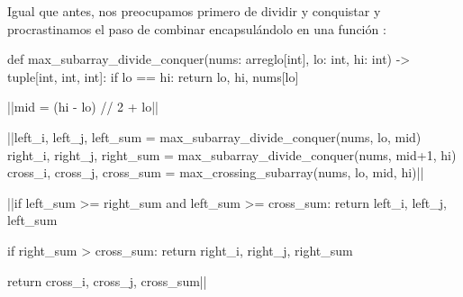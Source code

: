 Igual que antes, nos preocupamos primero de dividir y conquistar y procrastinamos el paso de combinar encapsulándolo en una función :
\begin{codeblock}
\begin{pseudocode}
def max_subarray_divide_conquer(nums: arreglo[int], lo: int, hi: int) -> tuple[int, int, int]:
    if lo == hi: return lo, hi, nums[lo]

    ||mid = (hi - lo) // 2 + lo||

    ||left_i, left_j, left_sum = max_subarray_divide_conquer(nums, lo, mid)
    right_i, right_j, right_sum = max_subarray_divide_conquer(nums, mid+1, hi)
    cross_i, cross_j, cross_sum = max_crossing_subarray(nums, lo, mid, hi)||

    ||if left_sum >= right_sum and left_sum >= cross_sum:
        return left_i, left_j, left_sum

    if right_sum > cross_sum:
        return right_i, right_j, right_sum

    return cross_i, cross_j, cross_sum||
\end{pseudocode}
\begin{annotations}
\end{annotations}
\end{codeblock}

